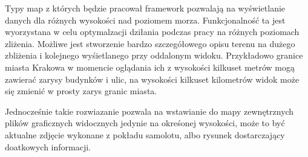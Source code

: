 \begin{description}
Typy map z których będzie pracował framework pozwalają na wyświetlanie danych dla różnych wysokości nad poziomem morza.
Funkcjonalność ta jest wyorzystana w celu optymalzacji dziłania podczas pracy na różnych poziomach zliżenia. Możliwe jest stworzenie bardzo szczegółowego opisu terenu na dużego zbliżenia i kolejnego wyśietlanego przy oddalonym widoku. Przykładowo granice miasta Krakowa w momencie oglądania ich z wysokości kilkuset metrów mogą zawierać zarysy budynków i ulic, na wysokości kilkuset kilometrów widok może się zmienić w prosty zarys granic miasta.

Jednocześnie takie rozwiazanie pozwala na wstawianie do mapy zewnętrznych plików graficznych widocznych jedynie na okreśonej wysokości, może to być aktualne zdjęcie wykonane z pokładu samolotu, albo rysunek dostarczający doatkowych informacji.
\end{description}
